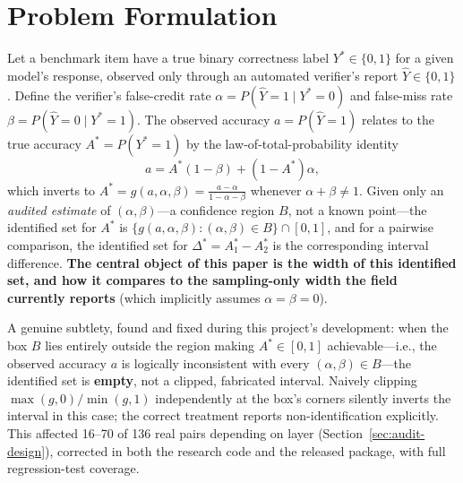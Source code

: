 \section{Problem Formulation}
\label{sec:problem-formulation}

Let a benchmark item have a true binary correctness label $Y^\ast \in \{0,1\}$
for a given model's response, observed only through an automated verifier's
report $\hat{Y} \in \{0,1\}$. Define the verifier's false-credit rate
$\alpha = P(\hat{Y}=1 \mid Y^\ast=0)$ and false-miss rate
$\beta = P(\hat{Y}=0 \mid Y^\ast=1)$. The observed accuracy
$a = P(\hat{Y}=1)$ relates to the true accuracy $A^\ast = P(Y^\ast=1)$ by the
law-of-total-probability identity
\begin{equation}
  a = A^\ast(1-\beta) + (1-A^\ast)\alpha,
  \label{eq:ltp}
\end{equation}
which inverts to $A^\ast = g(a,\alpha,\beta) = \frac{a-\alpha}{1-\alpha-\beta}$
whenever $\alpha+\beta \neq 1$. Given only an \emph{audited estimate} of
$(\alpha,\beta)$---a confidence region $B$, not a known point---the identified
set for $A^\ast$ is $\{g(a,\alpha,\beta) : (\alpha,\beta) \in B\} \cap [0,1]$,
and for a pairwise comparison, the identified set for
$\Delta^\ast = A_1^\ast - A_2^\ast$ is the corresponding interval difference.
\textbf{The central object of this paper is the width of this identified set,
and how it compares to the sampling-only width the field currently reports}
(which implicitly assumes $\alpha=\beta=0$).

A genuine subtlety, found and fixed during this project's development: when
the box $B$ lies entirely outside the region making $A^\ast \in [0,1]$
achievable---i.e., the observed accuracy $a$ is logically inconsistent with
every $(\alpha,\beta) \in B$---the identified set is \textbf{empty}, not a
clipped, fabricated interval. Naively clipping $\max(g,0)/\min(g,1)$
independently at the box's corners silently inverts the interval in this
case; the correct treatment reports non-identification explicitly. This
affected 16--70 of 136 real pairs depending on layer
(Section~\ref{sec:audit-design}), corrected in both the research code and the
released package, with full regression-test coverage.
